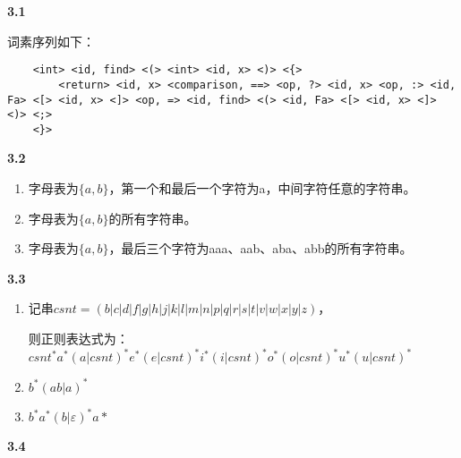 \documentclass[UTF8]{report}
\newcommand{\tbf}[1]{\textbf{#1}}
\begin{document}
\pagestyle{fancy}

\maketitle

\noindent
\tbf{3.1}

词素序列如下：

\begin{lstlisting}
    <int> <id, find> <(> <int> <id, x> <)> <{>
        <return> <id, x> <comparison, ==> <op, ?> <id, x> <op, :> <id, Fa> <[> <id, x> <]> <op, => <id, find> <(> <id, Fa> <[> <id, x> <]> <)> <;>
    <}>
\end{lstlisting}

\noindent
\tbf{3.2}

\begin{enumerate}[label=(\arabic*)]
    \item 字母表为$\{a, b\}$，第一个和最后一个字符为a，中间字符任意的字符串。
    \item 字母表为$\{a, b\}$的所有字符串。
    \item 字母表为$\{a, b\}$，最后三个字符为aaa、aab、aba、abb的所有字符串。
\end{enumerate}

\noindent
\tbf{3.3}

\begin{enumerate}[label=(\arabic*)]
    \item 记串$csnt = (b|c|d|f|g|h|j|k|l|m|n|p|q|r|s|t|v|w|x|y|z)$，
    
    则正则表达式为：$csnt^* a^* (a | csnt)^* e^* (e | csnt)^* i^* (i | csnt)^* o^* (o | csnt)^* u^* (u | csnt)^*$
    \item $b^*(ab | a)^*$
    \item $b^*a^*(b | \varepsilon)^*a*$
\end{enumerate}

\noindent
\tbf{3.4}
\end{document}
